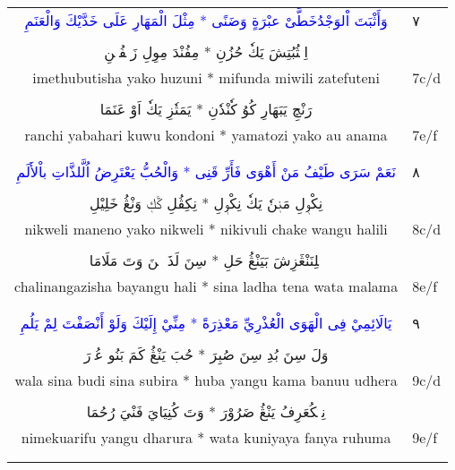 \documentclass[a4paper, 10pt]{report}
\begin{document}
\begin{longtable}{cl}
\textcolor{blue}{\textarabic{وَأَثْبَتَ اْلوَجْدُخَطَّىْ عبْرَةٍ وَضَنًى * مِثْلَ الْمَهَارِ عَلَى خَدَّيْكَ وَالْعَنَمِ}} & \textarabic{٧} \\* 
\E{ } & \\[2mm] 
\textcolor{mygreen}{\textarabic{اِمٖثُبُتِشَ يَكٗ حُزُنِ * مِفُنْدَ مِوِلِ زَتٖفُتٖنِ}} &  \\* 
imethubutisha yako huzuni * mifunda miwili zatefuteni & 7c/d \\* 
\E{ } & \\[2mm] 
\textcolor{mygreen}{\textarabic{رَنْچِ يَبَهَارِ كُوُ كٗنْدٗنِ * يَمَتٗزِ يَكٗ اَوْ عَنَمَا}} &  \\* 
ranchi yabahari kuwu kondoni * yamatozi yako au anama & 7e/f \\* 
\E{ } & \\[2mm] 
\\[6mm] 

\textcolor{blue}{\textarabic{نَعَمْ سَرَى طَيْفُ مَنْ أَهْوَى فَأَرِّ قَنِى * وَالْحُبُّ يَعْتَرِضُ اُلَّلذَّاتِ باْلأَلَمِ}} & \textarabic{٨} \\* 
\E{ } & \\[2mm] 
\textcolor{mygreen}{\textarabic{نِكْوٖلِ مَنٖنٗ يَكٗ نِكْوٖلِ * نِكِڤُلِ ػَكٖ وَنْڠُ خَلِيْلِ}} &  \\* 
nikweli maneno yako nikweli * nikivuli chake wangu halili & 8c/d \\* 
\E{ } & \\[2mm] 
\textcolor{mygreen}{\textarabic{ػَلِنَنْڠَزِشَ بَيَنْڠُ حَلِ * سِنَ لَذَ تٖنَ وَتَ مَلَامَا}} &  \\* 
chalinangazisha bayangu hali * sina ladha tena wata malama & 8e/f \\* 
\E{ } & \\[2mm] 
\\[6mm] 

\textcolor{blue}{\textarabic{يَالَائِمِيْ فِى الْهَوَى الْعُذْرِيِّ مَعْذِرَةً * مِنِّيْ إِلَيْكَ وَلَوْ أَنْصَفْتَ لِمْ يَلُمِ}} & \textarabic{٩} \\* 
\E{ } & \\[2mm] 
\textcolor{mygreen}{\textarabic{وَلَ سِنَ بُدِ سِنَ صُبِرَ * حُبَ يَنْڠُ كَمَ بَنُو عُذٖرَ}} &  \\* 
wala sina budi sina subira * huba yangu kama banuu udhera & 9c/d \\* 
\E{ } & \\[2mm] 
\textcolor{mygreen}{\textarabic{نِمٖكُعَرِفُ يَنْڠُ ضَرُوْرَ * وَتَ كُنِيَايَ فَنْيَ رُحُمَا}} &  \\* 
nimekuarifu yangu dharura * wata kuniyaya fanya ruhuma & 9e/f \\* 
\E{ } & \\[2mm] 
\\[6mm] 


\end{longtable}
\end{document}
